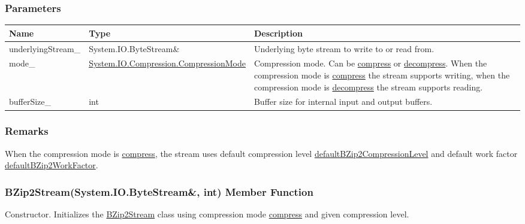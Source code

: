 \documentclass[a4paper,oneside,11.000000pt]{book}
\begin{document}
\subsubsection*{Parameters}
\begin{flushleft}
\begin{supertabular}[l]{!{\raggedright}p{4.10323cm}!{\raggedright}p{5.76344cm}!{\raggedright}p{4.93333cm}}
\textbf{Name}
& \textbf{Type}
& \textbf{Description}
\\
\hline
underlyingStream\_
& System.\-IO.\-ByteStream\&\-
& Underlying byte stream to write to or read from.

\\
mode\_
& \hyperlink{System.IO.Compression.CompressionMode}{System.\-IO.\-Compression.\-CompressionMode}
& Compression mode. Can be \hyperlink{System.IO.Compression.CompressionMode.compress}{compress} or \hyperlink{System.IO.Compression.CompressionMode.decompress}{decompress}.
When the compression mode is \hyperlink{System.IO.Compression.CompressionMode.compress}{compress} the stream supports writing,
when the compression mode is \hyperlink{System.IO.Compression.CompressionMode.decompress}{decompress} the stream supports reading.

\\
bufferSize\_
& int
& Buffer size for internal input and output buffers.

\\
\end{supertabular}

\end{flushleft}
\subsubsection*{Remarks}
\begin{flushleft}
When the compression mode is \hyperlink{System.IO.Compression.CompressionMode.compress}{compress}, the stream uses default compression level \hyperlink{System.IO.Compression.defaultBZip2CompressionLevel}{defaultBZip2CompressionLevel} and
default work factor \hyperlink{System.IO.Compression.defaultBZip2WorkFactor}{defaultBZip2WorkFactor}.

\end{flushleft}
\clearpage

\hypertarget{System.IO.Compression.BZip2Stream.constructor.P.System.IO.Compression.BZip2Stream.R.System.IO.ByteStream.int}{\subsubsection*{BZip2Stream(System.IO.ByteStream\&, int) Member Function}}
\begin{flushleft}
Constructor. Initializes the \hyperlink{System.IO.Compression.BZip2Stream}{BZip2Stream} class using compression mode \hyperlink{System.IO.Compression.CompressionMode.compress}{compress} and given compression level.

\end{flushleft}
\end{document}
